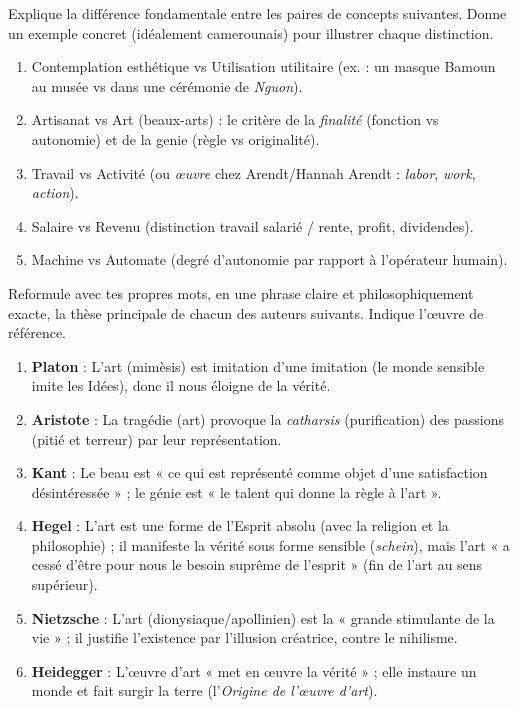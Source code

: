 \documentclass[11pt]{article}
\newcommand{\cle}[1]{{\popxbold\color{popdark}#1}}
\newcounter{popsec}
\newcounter{popsub}
\newcommand{\courssub}[1]{%
  \stepcounter{popsub}%
  \par\vspace{9pt}\noindent{\popxbold\fontsize{11.5}{13}\selectfont\color{popink}{\color{poporange}\thepopsec.\thepopsub}\hspace{6pt}#1}\par\nopagebreak\vspace{4pt}
}
\begin{document}
\begin{exercice}
Explique la différence fondamentale entre les paires de concepts suivantes. Donne un exemple concret (idéalement camerounais) pour illustrer chaque distinction.
\begin{enumerate}
\item \cle{Contemplation esthétique} vs \cle{Utilisation utilitaire} (ex. : un masque Bamoun au musée vs dans une cérémonie de \emph{Nguon}).
\item \cle{Artisanat} vs \cle{Art} (beaux-arts) : le critère de la \emph{finalité} (fonction vs autonomie) et de la \cle{genie} (règle vs originalité).
\item \cle{Travail} vs \cle{Activité} (ou \emph{œuvre} chez Arendt/Hannah Arendt : \emph{labor}, \emph{work}, \emph{action}).
\item \cle{Salaire} vs \cle{Revenu} (distinction travail salarié / rente, profit, dividendes).
\item \cle{Machine} vs \cle{Automate} (degré d'autonomie par rapport à l'opérateur humain).
\end{enumerate}
\end{exercice}

\courssub{Je m'entraîne}

\begin{exercice}
Reformule avec tes propres mots, en une phrase claire et philosophiquement exacte, la thèse principale de chacun des auteurs suivants. Indique l'œuvre de référence.
\begin{enumerate}
\item \textbf{Platon} : L'art (mimèsis) est imitation d'une imitation (le monde sensible imite les Idées), donc il nous éloigne de la vérité.
\item \textbf{Aristote} : La tragédie (art) provoque la \emph{catharsis} (purification) des passions (pitié et terreur) par leur représentation.
\item \textbf{Kant} : Le beau est « ce qui est représenté comme objet d'une satisfaction désintéressée » ; le génie est « le talent qui donne la règle à l'art ».
\item \textbf{Hegel} : L'art est une forme de l'Esprit absolu (avec la religion et la philosophie) ; il manifeste la vérité sous forme sensible (\emph{schein}), mais l'art « a cessé d'être pour nous le besoin suprême de l'esprit » (fin de l'art au sens supérieur).
\item \textbf{Nietzsche} : L'art (dionysiaque/apollinien) est la « grande stimulante de la vie » ; il justifie l'existence par l'illusion créatrice, contre le nihilisme.
\item \textbf{Heidegger} : L'œuvre d'art « met en œuvre la vérité » ; elle instaure un monde et fait surgir la terre (l'\emph{Origine de l'œuvre d'art}).
\end{enumerate}
\end{exercice}
\end{document}

